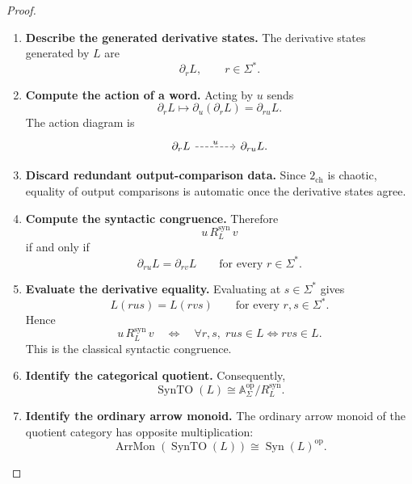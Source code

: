 \begin{proof}
    \leavevmode
    \begin{enumerate}
        \item \textbf{Describe the generated derivative states.}
        The derivative states generated by \(L\) are
        \[
            \partial_rL,
            \qquad
            r\in\Sigma^*.
        \]

        \item \textbf{Compute the action of a word.}
        Acting by \(u\) sends
        \[
            \partial_rL
            \longmapsto
            \partial_u(\partial_rL)
            =
            \partial_{ru}L.
        \]
        The action diagram is
        \[
        \begin{tikzcd}[column sep=large]
            \partial_rL
                \arrow[r, dashed, "u"]
            &
            \partial_{ru}L.
        \end{tikzcd}
        \]

        \item \textbf{Discard redundant output-comparison data.}
        Since \(2_{\mathrm{ch}}\) is chaotic, equality of output comparisons
        is automatic once the derivative states agree.

        \item \textbf{Compute the syntactic congruence.}
        Therefore
        \[
            u\,R_L^{\mathrm{syn}}\,v
        \]
        if and only if
        \[
            \partial_{ru}L
            =
            \partial_{rv}L
            \qquad
            \text{for every }r\in\Sigma^*.
        \]

        \item \textbf{Evaluate the derivative equality.}
        Evaluating at \(s\in\Sigma^*\) gives
        \[
            L(rus)=L(rvs)
            \qquad
            \text{for every }r,s\in\Sigma^*.
        \]
        Hence
        \[
            u\,R_L^{\mathrm{syn}}\,v
            \quad\Longleftrightarrow\quad
            \forall r,s,\;
            rus\in L
            \Longleftrightarrow
            rvs\in L.
        \]
        This is the classical syntactic congruence.

        \item \textbf{Identify the categorical quotient.}
        Consequently,
        \[
            \operatorname{SynTO}(L)
            \cong
            \mathbb A_\Sigma^{\mathrm{op}}/R_L^{\mathrm{syn}}.
        \]

        \item \textbf{Identify the ordinary arrow monoid.}
        The ordinary arrow monoid of the quotient category has opposite
        multiplication:
        \[
            \operatorname{ArrMon}(\operatorname{SynTO}(L))
            \cong
            \operatorname{Syn}(L)^{\mathrm{op}}.
        \]


\end{enumerate}
\end{proof}
